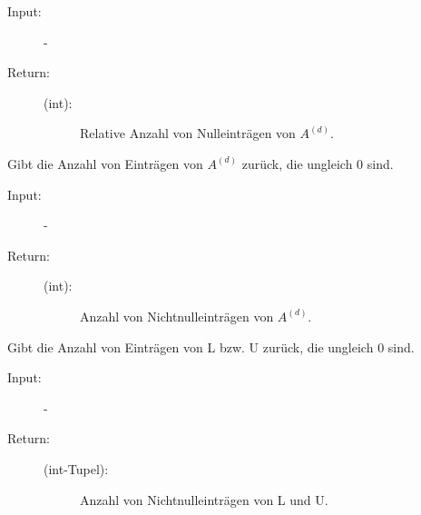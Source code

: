 \documentclass[letterpaper,10pt,ngerman, oneside, openright]{sphinxmanual}
\begin{document}
\begin{fulllineitems}
\begin{fulllineitems}
\begin{description}
\item [{Input:}] -
\end{description}
\begin{description}
\item[{Return:}] \leavevmode\begin{description}
\item[{(int):}] \leavevmode
Relative Anzahl von Nulleinträgen von $A^{(d)}$.

\end{description}

\end{description}

\end{fulllineitems}


\begin{fulllineitems}
\label{\detokenize{index:sparse_erw.Sparse.anz_nn_abs}}
Gibt die Anzahl von Einträgen von $A^{(d)}$ zurück, die ungleich 0 sind.

\begin{description}
\item [{Input:}] -
\end{description}
\begin{description}
\item[{Return:}] \leavevmode\begin{description}
\item[{(int):}] \leavevmode
Anzahl von Nichtnulleinträgen von $A^{(d)}$.

\end{description}

\end{description}

\end{fulllineitems}


\begin{fulllineitems}
\label{\detokenize{index:sparse_erw.Sparse.anz_nn_lu_abs}}
Gibt die Anzahl von Einträgen von L bzw. U zurück, die ungleich 0 sind.

\begin{description}
\item [{Input:}] -
\end{description}
\begin{description}
\item[{Return:}] \leavevmode\begin{description}
\item[{(int-Tupel):}] \leavevmode
Anzahl von Nichtnulleinträgen von L und U.


\end{description}
\end{description}
\end{fulllineitems}
\end{fulllineitems}
\end{document}
